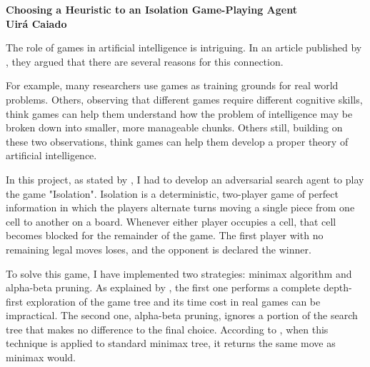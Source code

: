 \documentclass[a4paper]{article}
\begin{document}

\begin{center}

{\bf \large Choosing a Heuristic to an Isolation Game-Playing Agent \\ \small Uirá Caiado}
\end{center}



The role of games in artificial intelligence is intriguing. In an article published by \citep{Economist2017}, they argued that there are several reasons for this connection.

For example, many researchers use games as training grounds for real world problems. Others, observing that different games require different cognitive skills, think games can help them understand how the problem of intelligence may be broken down into smaller, more manageable chunks. Others still, building on these two observations, think games can help them develop a proper theory of artificial intelligence.

In this project, as stated by \cite{Udacity2017}, I had to develop an adversarial search agent to play the game "Isolation".  Isolation is a deterministic, two-player game of perfect information in which the players alternate turns moving a single piece from one cell to another on a board. Whenever either player occupies a cell, that cell becomes blocked for the remainder of the game. The first player with no remaining legal moves loses, and the opponent is declared the winner.


To solve this game, I have implemented two strategies: minimax algorithm and alpha-beta pruning. As explained by \cite{russelartificial}, the first one performs a complete depth-first exploration of the game tree and its time cost in real games can be impractical. The second one, alpha-beta pruning, ignores a portion of the search tree that makes no difference to the final choice. According to \cite{russelartificial}, when this technique is applied to standard minimax tree, it returns the same move as minimax would.
\end{document}
